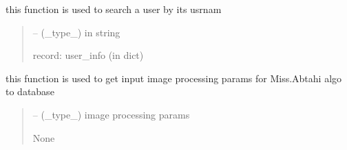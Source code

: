 \documentclass[letterpaper,10pt,english]{sphinxmanual}
\begin{document}
\begin{savenotes}
\begin{fulllineitems}
\begin{savenotes}
\begin{fulllineitems}
\end{fulllineitems}\end{savenotes}


\begin{savenotes}\begin{fulllineitems}
\label{\detokenize{setting/database_utils:oxin.database_utils.dataBaseUtils.search_user_by_user_name}}
\pysigstartsignatures
{}
\pysigstopsignatures
\sphinxAtStartPar
this function is used to search a user by its usrnam
\begin{quote}\begin{description}
\sphinxAtStartPar
{} – (\_type\_) in string

\sphinxAtStartPar
record: user\_info (in dict)

\end{description}\end{quote}

\end{fulllineitems}\end{savenotes}


\begin{savenotes}\begin{fulllineitems}
\label{\detokenize{setting/database_utils:oxin.database_utils.dataBaseUtils.set_image_processing_parms}}
\pysigstartsignatures
{}
\pysigstopsignatures
\sphinxAtStartPar
this function is used to get input image processing params for Miss.Abtahi algo to database
\begin{quote}\begin{description}
\sphinxAtStartPar
{} – (\_type\_) image processing params

\sphinxAtStartPar
None


\end{description}
\end{quote}
\end{fulllineitems}
\end{savenotes}
\end{fulllineitems}
\end{savenotes}
\end{document}
